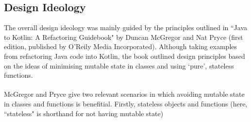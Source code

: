 \documentclass[../main.tex]{subfiles}
\begin{document}
\subsection{Design Ideology}
The overall design ideology was mainly guided by the principles outlined in ``Java to Kotlin: A Refactoring Guidebook" by Duncan McGregor and Nat Pryce (first edition, published by O'Reily Media Incorporated). Although taking examples from refactoring Java code into Kotlin, the book outlined design principles based on the ideas of minimising mutable state in classes and using `pure', stateless functions. 
\\
\\
McGregor and Pryce give two relevant scenarios in which avoiding mutable state in classes and functions is benefitial. Firstly, stateless objects and functions (here, ``stateless" is shorthand for not having mutable state) 
\end{document}
